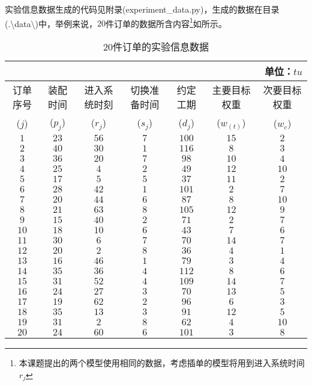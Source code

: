 实验信息数据生成的代码见附录(experiment\_data.py)，生成的数据在目录(.\textbackslash data\textbackslash)中，举例来说，$20$件订单的数据所含内容\footnote{本课题提出的两个模型使用相同的数据，考虑插单的模型将用到进入系统时间$r_j$}如所示。
\begin{table}[h]
  \centering
  \caption{$20$件订单的实验信息数据}
    \begin{tabular}{ccccccc}
     	&	&	&	&	&	&\multicolumn{1}{r}{单位：$tu$}\\
    \toprule
    订单序号 & 装配时间 & 进入系统时刻 & 切换准备时间& 约定工期 & 主要目标权重 & 次要目标权重 \\
    ($j$) & ($p_j$) & ($r_j$) &($s_j$) &($d_j$) &($w_{(t)}$) & ($w_c$) \\
    \midrule
    $1     $&$ 23    $&$ 56    $&$ 7     $&$ 100   $&$ 15    $&$ 2$ \\
    $2     $&$ 40    $&$ 30    $&$ 1     $&$ 116   $&$ 8     $&$ 3$ \\
    $3     $&$ 36    $&$ 20    $&$ 7     $&$ 98    $&$ 10    $&$ 4$ \\
    $4     $&$ 25    $&$ 4     $&$ 2     $&$ 49    $&$ 12    $&$ 10$ \\
    $5     $&$ 17    $&$ 5     $&$ 5     $&$ 37    $&$ 11    $&$ 2$ \\
    $6     $&$ 28    $&$ 42    $&$ 1     $&$ 101   $&$ 2     $&$ 7$ \\
    $7     $&$ 20    $&$ 44    $&$ 6     $&$ 87    $&$ 8     $&$ 10$ \\
    $8     $&$ 21    $&$ 63    $&$ 8     $&$ 105   $&$ 12    $&$ 9$ \\
    $9     $&$ 15    $&$ 40    $&$ 2     $&$ 71    $&$ 2     $&$ 7$ \\
    $10    $&$ 18    $&$ 10    $&$ 6     $&$ 43    $&$ 7     $&$ 6$ \\
    $11    $&$ 30    $&$ 6     $&$ 7     $&$ 70    $&$ 14    $&$ 7$ \\
    $12    $&$ 20    $&$ 2     $&$ 8     $&$ 36    $&$ 4     $&$ 1$ \\
    $13    $&$ 16    $&$ 46    $&$ 1     $&$ 79    $&$ 3     $&$ 4$ \\
    $14    $&$ 35    $&$ 36    $&$ 4     $&$ 112   $&$ 8     $&$ 6$ \\
    $15    $&$ 31    $&$ 52    $&$ 4     $&$ 109   $&$ 14    $&$ 7$ \\
    $16    $&$ 24    $&$ 27    $&$ 3     $&$ 70    $&$ 13    $&$ 5$ \\
    $17    $&$ 19    $&$ 62    $&$ 2     $&$ 96    $&$ 6     $&$ 3$ \\
    $18    $&$ 35    $&$ 13    $&$ 3     $&$ 91    $&$ 12    $&$ 5$ \\
    $19    $&$ 31    $&$ 2     $&$ 8     $&$ 62    $&$ 4     $&$ 10 $\\
    $20    $&$ 24    $&$ 60    $&$ 6     $&$ 101   $&$ 3     $&$ 8$ \\
    \bottomrule
    \end{tabular}
  \label{tab:20itemsdata}
\end{table}

